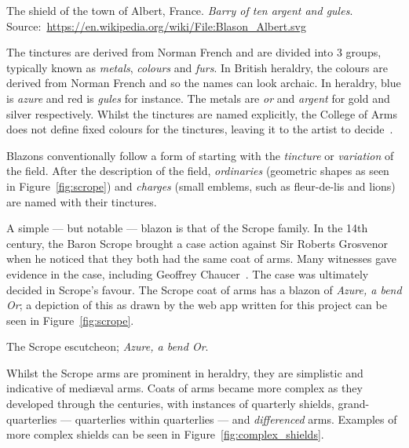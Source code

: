 \documentclass[nobib, a4paper, twoside, justified]{tufte-book}
\begin{document}
\begin{marginfigure}
  \centering
  \def\svgwidth{0.8\linewidth}
  
  \caption{The shield of the town of Albert, France. \textit{Barry of ten argent and
  gules}. Source:~\url{https://en.wikipedia.org/wiki/File:Blason_Albert.svg}}\label{fig:blason_albert}
\end{marginfigure}

The tinctures are derived from Norman French and are divided into 3 groups, typically known as
\textit{metals}, \textit{colours} and \textit{furs}. In British heraldry, the colours are derived
from Norman French and so the names can look archaic. In heraldry, blue is \textit{azure} and red
is \textit{gules} for instance. The metals are \textit{or} and \textit{argent} for gold and silver
respectively. Whilst the tinctures are named explicitly, the College of Arms does not define fixed
colours for the tinctures, leaving it to the artist to decide~\autocite{college_of_arms_faq}.

Blazons conventionally follow a form of starting with the \textit{tincture} or \textit{variation}
of the field. After the description of the field, \textit{ordinaries} (geometric shapes as seen in
Figure~\ref{fig:scrope}) and \textit{charges} (small emblems, such as fleur-de-lis and lions) are
named with their tinctures.

A simple --- but notable --- blazon is that of the Scrope family. In the 14th century, the Baron
Scrope brought a case action against Sir Roberts Grosvenor when he noticed that they both had the
same coat of arms. Many witnesses gave evidence in the case, including Geoffrey
Chaucer~\autocite{scrope_grosvenor}. The case was ultimately decided in Scrope's favour. The Scrope
coat of arms has a blazon of \textit{Azure, a bend Or}; a depiction of this as drawn by the web app
written for this project can be seen in Figure~\ref{fig:scrope}.

\begin{marginfigure}
  \centering
  \def\svgwidth{0.8\linewidth}
  
  \caption{The Scrope escutcheon; \textit{Azure, a bend Or}.}\label{fig:scrope}
\end{marginfigure}


Whilst the Scrope arms are prominent in heraldry, they are simplistic and indicative of
medi\ae{}val arms. Coats of arms became more complex as they developed through the centuries, with
instances of quarterly shields, grand-quarterlies --- quarterlies within quarterlies --- and
\textit{differenced} arms. Examples of more complex shields can be seen in
Figure~\ref{fig:complex_shields}.
\end{document}
